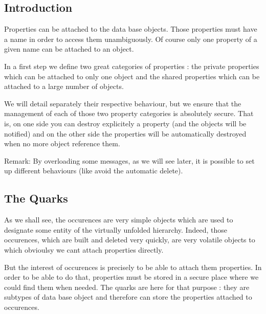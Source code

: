 \hypertarget{classHurricane_1_1Property_secPropertyIntro}{}\subsection{Introduction}\label{classHurricane_1_1Property_secPropertyIntro}
Properties can be attached to the data base objects. Those properties must have a name in order to access them unambiguously. Of course only one property of a given name can be attached to an object.

In a first step we define two great categories of properties \+: the private properties which can be attached to only one object and the shared properties which can be attached to a large number of objects.

We will detail separately their respective behaviour, but we ensure that the management of each of those two property categories is absolutely secure. That is, on one side you can destroy explicitely a property (and the objects will be notified) and on the other side the properties will be automatically destroyed when no more object reference them.

\begin{DoxyParagraph}{Remark\+: By overloading some messages, as we will see later, it is }
possible to set up different behaviours (like avoid the automatic delete).
\end{DoxyParagraph}
\hypertarget{classHurricane_1_1Property_secPropertyTheQuarks}{}\subsection{The Quarks}\label{classHurricane_1_1Property_secPropertyTheQuarks}
As we shall see, the occurences are very simple objects which are used to designate some entity of the virtually unfolded hierarchy. Indeed, those occurences, which are built and deleted very quickly, are very volatile objects to which obvioulsy we can\textquotesingle{}t attach properties directly.

But the interest of occurences is precisely to be able to attach them properties. In order to be able to do that, properties must be stored in a secure place where we could find them when needed. The quarks are here for that purpose \+: they are subtypes of data base object and therefore can store the properties attached to occurences.

